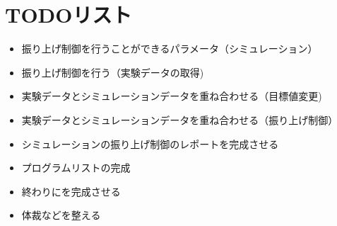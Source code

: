 \section{TODOリスト}
	\begin{itemize}
		\item 振り上げ制御を行うことができるパラメータ（シミュレーション）
		\item 振り上げ制御を行う（実験データの取得)
		\item 実験データとシミュレーションデータを重ね合わせる（目標値変更)
		\item 実験データとシミュレーションデータを重ね合わせる（振り上げ制御）
		\item シミュレーションの振り上げ制御のレポートを完成させる
		\item プログラムリストの完成
		\item 終わりにを完成させる
		\item 体裁などを整える
		
	\end{itemize}